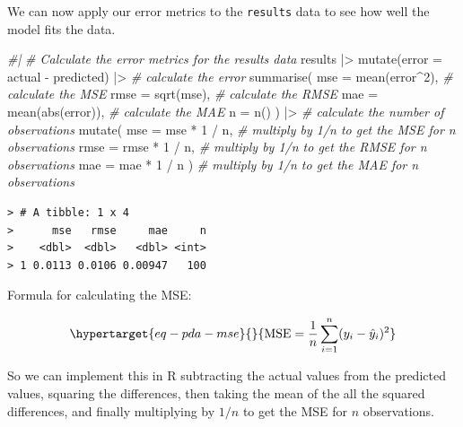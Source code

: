 \documentclass[
  letterpaper,
]{latex/krantz}
\newenvironment{Shaded}{\begin{snugshade}}{\end{snugshade}}
\newcommand{\AttributeTok}[1]{\textcolor[rgb]{0.00,0.00,0.00}{#1}}
\newcommand{\CommentTok}[1]{\textcolor[rgb]{0.00,0.00,0.00}{\textit{#1}}}
\newcommand{\DecValTok}[1]{\textcolor[rgb]{0.00,0.00,0.00}{#1}}
\newcommand{\FunctionTok}[1]{\textcolor[rgb]{0.00,0.00,0.00}{#1}}
\newcommand{\NormalTok}[1]{\textcolor[rgb]{0.00,0.00,0.00}{#1}}
\newcommand{\SpecialCharTok}[1]{\textcolor[rgb]{0.00,0.00,0.00}{#1}}
\begin{document}
We can now apply our error metrics to the \texttt{results} data to see
how well the model fits the data.

\begin{Shaded}
\begin{Highlighting}[]
\CommentTok{\#|}
\CommentTok{\# Calculate the error metrics for the \textasciigrave{}results\textasciigrave{} data}
\NormalTok{results }\SpecialCharTok{|\textgreater{}}
  \FunctionTok{mutate}\NormalTok{(}\AttributeTok{error =}\NormalTok{ actual }\SpecialCharTok{{-}}\NormalTok{ predicted) }\SpecialCharTok{|\textgreater{}} \CommentTok{\# calculate the error}
  \FunctionTok{summarise}\NormalTok{(}
    \AttributeTok{mse =} \FunctionTok{mean}\NormalTok{(error}\SpecialCharTok{\^{}}\DecValTok{2}\NormalTok{), }\CommentTok{\# calculate the MSE}
    \AttributeTok{rmse =} \FunctionTok{sqrt}\NormalTok{(mse), }\CommentTok{\# calculate the RMSE}
    \AttributeTok{mae =} \FunctionTok{mean}\NormalTok{(}\FunctionTok{abs}\NormalTok{(error)), }\CommentTok{\# calculate the MAE}
    \AttributeTok{n =} \FunctionTok{n}\NormalTok{()}
\NormalTok{  ) }\SpecialCharTok{|\textgreater{}} \CommentTok{\# calculate the number of observations}
  \FunctionTok{mutate}\NormalTok{(}
    \AttributeTok{mse =}\NormalTok{ mse }\SpecialCharTok{*} \DecValTok{1} \SpecialCharTok{/}\NormalTok{ n, }\CommentTok{\# multiply by 1/n to get the MSE for n observations}
    \AttributeTok{rmse =}\NormalTok{ rmse }\SpecialCharTok{*} \DecValTok{1} \SpecialCharTok{/}\NormalTok{ n, }\CommentTok{\# multiply by 1/n to get the RMSE for n observations}
    \AttributeTok{mae =}\NormalTok{ mae }\SpecialCharTok{*} \DecValTok{1} \SpecialCharTok{/}\NormalTok{ n}
\NormalTok{  ) }\CommentTok{\# multiply by 1/n to get the MAE for n observations}
\end{Highlighting}
\end{Shaded}

\begin{verbatim}
> # A tibble: 1 x 4
>      mse   rmse     mae     n
>    <dbl>  <dbl>   <dbl> <int>
> 1 0.0113 0.0106 0.00947   100
\end{verbatim}

Formula for calculating the MSE:

\begin{equation}\protect\hypertarget{eq-pda-mse}{}{
\text{MSE} = \frac{1}{n} \sum_{i=1}^{n} (y_i - \hat{y}_i)^2
}\label{eq-pda-mse}\end{equation}

So we can implement this in R subtracting the actual values from the
predicted values, squaring the differences, then taking the mean of the
all the squared differences, and finally multiplying by \(1/n\) to get
the MSE for \(n\) observations.
\end{document}
